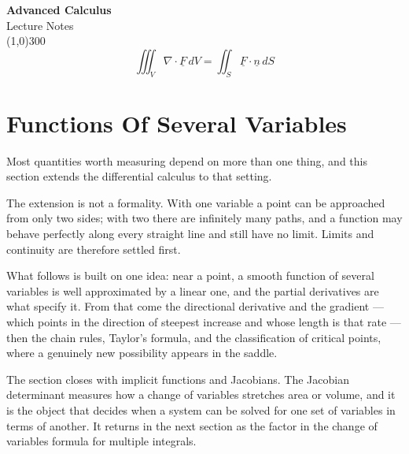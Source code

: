 \documentclass[11pt,a4paper]{article}
\theoremstyle{definition}
\begin{document}
\begin{titlepage}
\begin{center}
\vspace*{3cm}
{\Huge\bfseries Advanced Calculus}\\[1.2cm]
{\large Lecture Notes}\\[2.5cm]
\line(1,0){300}\\[1.5cm]
$$\iiint_V \nabla\cdot\underline{F}\,dV = \iint_S \underline{F}\cdot\underline{n}\,dS$$
\end{center}
\end{titlepage}

\tableofcontents
\thispagestyle{empty}
\clearpage
\setcounter{page}{1}

{\color[wave]{485}\section{Functions Of Several Variables}}

Most quantities worth measuring depend on more than one thing, and this section
extends the differential calculus to that setting.

The extension is not a formality. With one variable a point can be approached
from only two sides; with two there are infinitely many paths, and a function
may behave perfectly along every straight line and still have no limit. Limits
and continuity are therefore settled first.

What follows is built on one idea: near a point, a smooth function of several
variables is well approximated by a linear one, and the partial derivatives are
what specify it. From that come the directional derivative and the gradient ---
which points in the direction of steepest increase and whose length is that rate
--- then the chain rules, Taylor's formula, and the classification of critical
points, where a genuinely new possibility appears in the saddle.

The section closes with implicit functions and Jacobians. The Jacobian
determinant measures how a change of variables stretches area or volume, and it
is the object that decides when a system can be solved for one set of variables
in terms of another. It returns in the next section as the factor in the change
of variables formula for multiple integrals.
\end{document}
